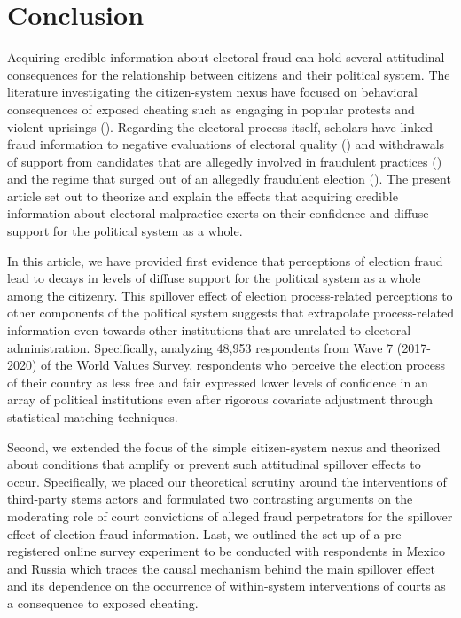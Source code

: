 \documentclass[11pt, ngerman,english,a4]{article}
\begin{document}
\section*{Conclusion}

Acquiring credible information about electoral fraud can hold several attitudinal consequences for the relationship between citizens and their political system. The literature investigating the citizen-system nexus have focused on behavioral consequences of exposed cheating such as engaging in popular protests and violent uprisings (\citealt{Daxecker2012}). Regarding the electoral process itself, scholars have linked fraud information to negative evaluations of electoral quality (\citealt{Robertson2017}) and withdrawals of support from candidates that are allegedly involved in fraudulent practices (\citealt{Reuter2019}) and the regime that surged out of an allegedly fraudulent election (\citealt{Williamson2021}). The present article set out to theorize and explain the effects that acquiring credible information about electoral malpractice exerts on their confidence and diffuse support for the political system as a whole. 

In this article, we have provided first evidence that perceptions of election fraud lead to decays in levels of diffuse support for the political system as a whole among the citizenry. This spillover effect of election process-related perceptions to other components of the political system suggests that extrapolate process-related information even towards other institutions that are unrelated to electoral administration. Specifically, analyzing 48,953 respondents from Wave 7 (2017-2020) of the World Values Survey, respondents who perceive the election process of their country as less free and fair expressed lower levels of confidence in an array of political institutions even after rigorous covariate adjustment through statistical matching techniques. 

Second, we extended the focus of the simple citizen-system nexus and theorized about conditions that amplify or prevent such attitudinal spillover effects to occur. Specifically, we placed our theoretical scrutiny around the interventions of third-party stems actors and formulated two contrasting arguments on the moderating role of court convictions of alleged fraud perpetrators for the spillover effect of election fraud information. Last, we outlined the set up of a pre-registered online survey experiment to be conducted with respondents in Mexico and Russia which traces the causal mechanism behind the main spillover effect and its dependence on the occurrence of within-system interventions of courts as a consequence to exposed cheating. 
\end{document}

